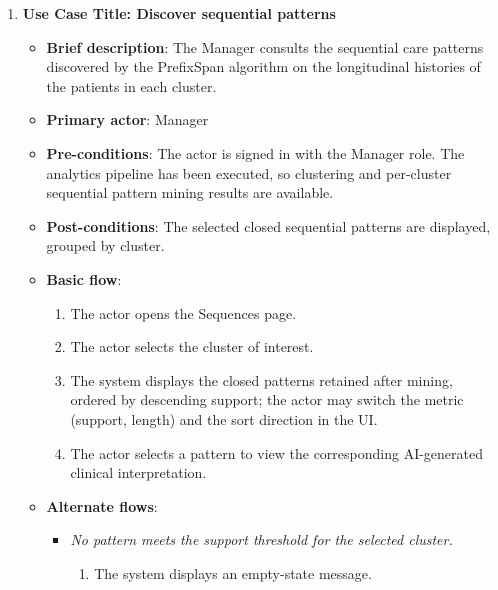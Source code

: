 \begin{enumerate}
\vspace{0.5em}

\item \textbf{Use Case Title: Discover sequential patterns}
\begin{itemize}
    \item \textbf{Brief description}: The Manager consults the sequential care patterns discovered by the PrefixSpan algorithm on the longitudinal histories of the patients in each cluster.
    \item \textbf{Primary actor}: Manager
    \item \textbf{Pre-conditions}: The actor is signed in with the Manager role. The analytics pipeline has been executed, so clustering and per-cluster sequential pattern mining results are available.
    \item \textbf{Post-conditions}: The selected closed sequential patterns are displayed, grouped by cluster.
    \item \textbf{Basic flow}:
    \begin{enumerate}
        \item The actor opens the Sequences page.
        \item The actor selects the cluster of interest.
        \item The system displays the closed patterns retained after mining, ordered by descending support; the actor may switch the metric (support, length) and the sort direction in the UI.
        \item The actor selects a pattern to view the corresponding AI-generated clinical interpretation.
    \end{enumerate}
    \item \textbf{Alternate flows}:
    \begin{itemize}
        \item[3a.] \textit{No pattern meets the support threshold for the selected cluster.}
        \begin{enumerate}
            \item The system displays an empty-state message.
        \end{enumerate}
    \end{itemize}
\end{itemize}

\vspace{0.5em}


\end{enumerate}
